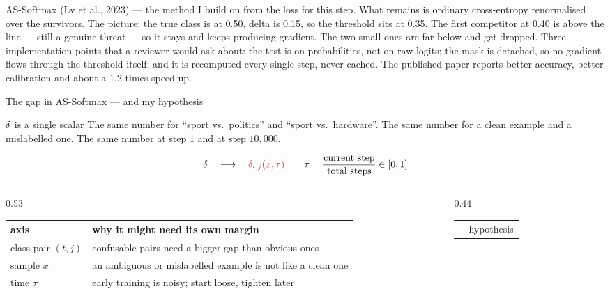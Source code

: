 \begin{frame}{AS-Softmax (Lv et al., 2023) --- the method I build on}
{    from the loss for this step. What remains is ordinary cross-entropy
    renormalised over the survivors. The picture: the true class is at 0.50,
    delta is 0.15, so the threshold sits at 0.35. The first competitor at 0.40
    is above the line --- still a genuine threat --- so it stays and keeps
    producing gradient. The two small ones are far below and get dropped. Three
    implementation points that a reviewer would ask about: the test is on
    probabilities, not on raw logits; the mask is detached, so no gradient flows
    through the threshold itself; and it is recomputed every single step, never
    cached. The published paper reports better accuracy, better calibration and
    about a 1.2 times speed-up.%
  }
\end{frame}

\begin{frame}{The gap in AS-Softmax --- and my hypothesis}
  \small
  \begin{alertblock}{$\delta$ is a single scalar}
    The same number for ``sport vs.\ politics'' and ``sport vs.\ hardware''.
    The same number for a clean example and a mislabelled one.
    The same number at step $1$ and at step $10{,}000$.
  \end{alertblock}
  \vspace{-0.2em}
  \[
    \dlt \quad\longrightarrow\quad \mhit{\dltf}
    \qquad
    \tau = \frac{\text{current step}}{\text{total steps}} \in [0,1]
  \]
  \begin{columns}[T]
    \begin{column}{0.53\textwidth}
      \centering\scriptsize
      \begin{tabular}{@{}p{1.6cm}p{4.4cm}@{}}
        \toprule
        axis & why it might need its own margin \\
        \midrule
        class-pair $(t,j)$ & confusable pairs need a bigger gap than obvious ones \\
        sample $x$ & an ambiguous or mislabelled example is not like a clean one \\
        time $\tau$ & early training is noisy; start loose, tighten later \\
        \bottomrule
      \end{tabular}
    \end{column}
    \begin{column}{0.44\textwidth}
      \centering\scriptsize
      \begin{tabular}{@{}l>{\raggedright\arraybackslash}p{4.0cm}@{}}
        \toprule
        & hypothesis \\

\end{tabular}
\end{column}
\end{columns}
\end{frame}
